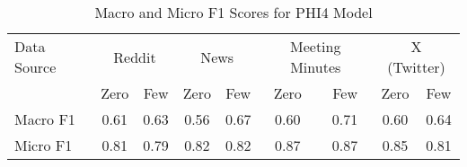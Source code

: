 \begin{table}[htbp]
\centering
\begin{tabular}{l *{8}{c}}
\toprule
Data Source & \multicolumn{2}{c}{Reddit} & \multicolumn{2}{c}{News} & \multicolumn{2}{c}{Meeting Minutes} & \multicolumn{2}{c}{X (Twitter)} \\
& Zero & Few & Zero & Few & Zero & Few & Zero & Few \\
\midrule
Macro F1 & 0.61 & 0.63 & 0.56 & 0.67 & 0.60 & 0.71 & 0.60 & 0.64 \\
Micro F1 & 0.81 & 0.79 & 0.82 & 0.82 & 0.87 & 0.87 & 0.85 & 0.81 \\
\bottomrule
\end{tabular}
\caption{Macro and Micro F1 Scores for PHI4 Model}
\label{tab:phi4_macro_micro}
\end{table}